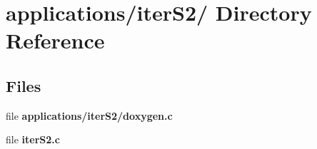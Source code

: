 \hypertarget{dir_000012}{
\section{applications/iter\-S2/ Directory Reference}
\label{dir_000012}
}
\subsection*{Files}
\begin{CompactItemize}
\item 
file {\bf applications/iter\-S2/doxygen.c}
\item 
file {\bf iter\-S2.c}
\end{CompactItemize}

